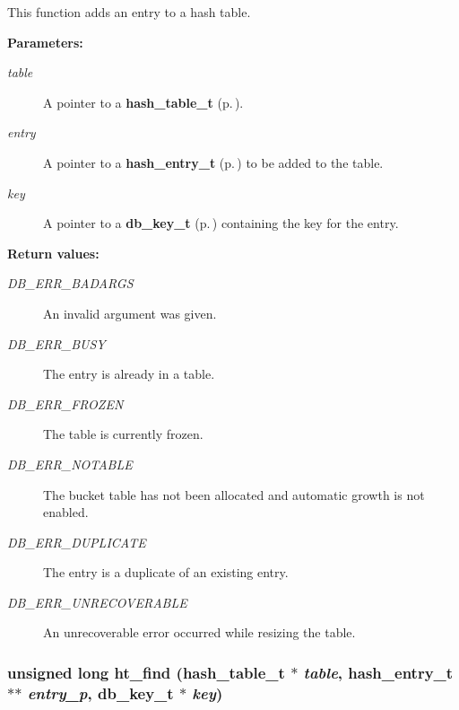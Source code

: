  This function adds an entry to a hash table.\begin{Desc}
\item[{\bf Parameters: }]\par
\begin{description}
\item[
{\em table}]A pointer to a {\bf hash\_\-table\_\-t} {\rm (p.\,\pageref{group__dbprim__hash_a0})}. \item[
{\em entry}]A pointer to a {\bf hash\_\-entry\_\-t} {\rm (p.\,\pageref{group__dbprim__hash_a1})} to be added to the table. \item[
{\em key}]A pointer to a {\bf db\_\-key\_\-t} {\rm (p.\,\pageref{group__dbprim__key_a0})} containing the key for the entry.\end{description}
\end{Desc}
\begin{Desc}
\item[{\bf Return values: }]\par
\begin{description}
\item[
{\em DB\_\-ERR\_\-BADARGS}]An invalid argument was given. \item[
{\em DB\_\-ERR\_\-BUSY}]The entry is already in a table. \item[
{\em DB\_\-ERR\_\-FROZEN}]The table is currently frozen. \item[
{\em DB\_\-ERR\_\-NOTABLE}]The bucket table has not been allocated and automatic growth is not enabled. \item[
{\em DB\_\-ERR\_\-DUPLICATE}]The entry is a duplicate of an existing entry. \item[
{\em DB\_\-ERR\_\-UNRECOVERABLE}]An unrecoverable error occurred while resizing the table. \end{description}
\end{Desc}
\subsubsection{\setlength{\rightskip}{0pt plus 5cm}unsigned long ht\_\-find ({\bf hash\_\-table\_\-t} $\ast$ {\em table}, {\bf hash\_\-entry\_\-t} $\ast$$\ast$ {\em entry\_\-p}, {\bf db\_\-key\_\-t} $\ast$ {\em key})}\label{group__dbprim__hash_a10}




